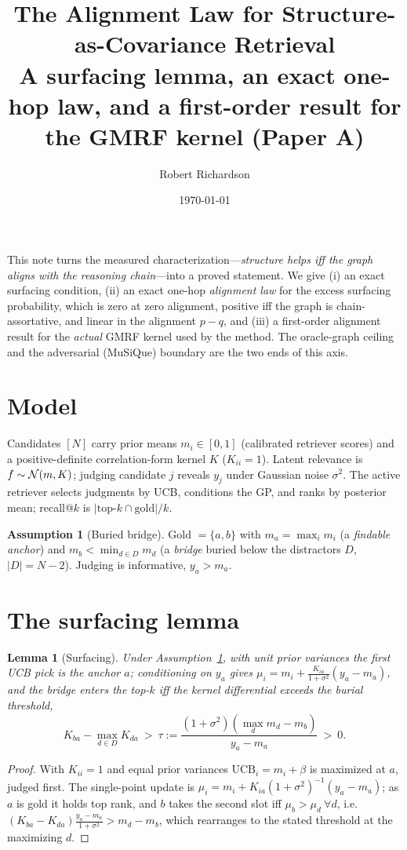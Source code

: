 \documentclass[11pt]{article}
\title{\textbf{The Alignment Law for Structure-as-Covariance Retrieval}\\[3pt]
\large A surfacing lemma, an exact one-hop law, and a first-order result for the GMRF kernel (Paper A)}
\author{Robert Richardson}\date{\today}
\theoremstyle{plain}\newtheorem{theorem}{Theorem}\newtheorem{lemma}{Lemma}\newtheorem{proposition}{Proposition}
\theoremstyle{definition}\newtheorem{assumption}{Assumption}\newtheorem{remark}{Remark}
\begin{document}
\maketitle

\noindent This note turns the measured characterization---\emph{structure helps iff the graph aligns with the
reasoning chain}---into a proved statement. We give (i) an exact surfacing condition, (ii) an exact one-hop
\emph{alignment law} for the excess surfacing probability, which is zero at zero alignment, positive iff the graph
is chain-assortative, and linear in the alignment $p-q$, and (iii) a first-order alignment result for the
\emph{actual} GMRF kernel used by the method. The oracle-graph ceiling and the adversarial (MuSiQue) boundary are
the two ends of this axis.

\section{Model}
Candidates $[N]$ carry prior means $m_i\in[0,1]$ (calibrated retriever scores) and a positive-definite
correlation-form kernel $K$ ($K_{ii}=1$). Latent relevance is $f\sim\mathcal{N}(m,K)$; judging candidate $j$ reveals $y_j$
under Gaussian noise $\sigma^2$. The active retriever selects judgments by UCB, conditions the GP, and ranks by
posterior mean; recall@$k$ is $|\text{top-}k\cap\text{gold}|/k$.
\begin{assumption}[Buried bridge]\label{ass:bridge}
Gold $=\{a,b\}$ with $m_a=\max_i m_i$ (a \emph{findable anchor}) and $m_b<\min_{d\in D}m_d$ (a \emph{bridge}
buried below the distractors $D$, $|D|=N-2$). Judging is informative, $y_a>m_a$.
\end{assumption}

\section{The surfacing lemma}
\begin{lemma}[Surfacing]\label{lem:surface}
Under Assumption~\ref{ass:bridge}, with unit prior variances the first UCB pick is the anchor $a$; conditioning on
$y_a$ gives $\mu_i=m_i+\tfrac{K_{ia}}{1+\sigma^2}(y_a-m_a)$, and the bridge enters the top-$k$ iff the
\emph{kernel differential} exceeds the burial threshold,
\[
   K_{ba}-\max_{d\in D}K_{da}\ >\ \tau:=\frac{(1+\sigma^2)(\max_d m_d-m_b)}{y_a-m_a}\ >\ 0.
\]
\end{lemma}
\begin{proof}
With $K_{ii}=1$ and equal prior variances $\mathrm{UCB}_i=m_i+\beta$ is maximized at $a$, judged first. The
single-point update is $\mu_i=m_i+K_{ia}(1+\sigma^2)^{-1}(y_a-m_a)$; as $a$ is gold it holds top rank, and $b$
takes the second slot iff $\mu_b>\mu_d\ \forall d$, i.e.\ $(K_{ba}-K_{da})\tfrac{y_a-m_a}{1+\sigma^2}>m_d-m_b$,
which rearranges to the stated threshold at the maximizing $d$.
\end{proof}
\end{document}
